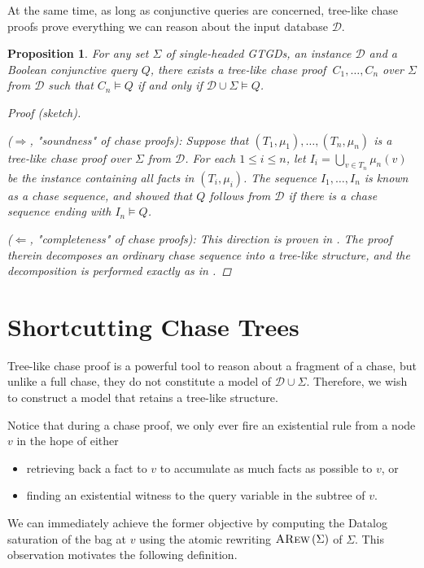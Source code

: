 \documentclass[12pt]{report}
\theoremstyle{plain}
\newtheorem{proposition}[theorem]{Proposition}
\theoremstyle{definition}
\newcommand{\ARew}[1]{\ensuremath{\normalfont{\textsc{ARew}} \left( #1 \right)}}
\begin{document}
At the same time, as long as conjunctive queries are concerned, tree-like chase proofs prove everything we can reason about the input database $\mathcal{D}$.

\begin{proposition}
\label{chase-proof-completeness}
  For any set $\Sigma$ of single-headed GTGDs, an instance $\mathcal{D}$ and a Boolean conjunctive query $Q$, there exists a tree-like chase proof $\ C_1, \ldots, C_n$ over $\Sigma$ from $\mathcal{D}$ such that $C_n \models Q$ if and only if $\mathcal{D} \cup \Sigma \models Q$.
  \begin{proof}[Proof (sketch)] $ $\par
    ($\Longrightarrow$, "soundness" of chase proofs): Suppose that $(T_1, \mu_1), \ldots, (T_n, \mu_n)$ is a tree-like chase proof over $\Sigma$ from $\mathcal{D}$. For each $1 \leq i \leq n$, let $I_i = \bigcup_{v \in T_n} \mu_n(v)$ be the instance containing all facts in $(T_i, \mu_i)$. The sequence $I_1, \ldots, I_n$ is known as a \emph{chase sequence}, and \cite{fagin_kolaitis_miller_popa_2005} showed that $Q$ follows from $\mathcal{D}$ if there is a chase sequence ending with $I_n \models Q$.

    ($\Longleftarrow$, "completeness" of chase proofs): This direction is proven in \cite[Proposition 2.6.9]{kappelmann_2019}. The proof therein decomposes an ordinary chase sequence into a tree-like structure, and the decomposition is performed exactly as in .
  \end{proof}
\end{proposition}

\section{Shortcutting Chase Trees}

Tree-like chase proof is a powerful tool to reason about a fragment of a chase, but unlike a full chase, they do not constitute a model of $\mathcal{D} \cup \Sigma$. Therefore, we wish to construct a model that retains a tree-like structure.

Notice that during a chase proof, we only ever fire an existential rule from a node $v$ in the hope of either
\begin{itemize}
  \item retrieving back a fact to $v$ to accumulate as much facts as possible to $v$, or
  \item finding an existential witness to the query variable in the subtree of $v$.
\end{itemize}
We can immediately achieve the former objective by computing the Datalog saturation of the bag at $v$ using the atomic rewriting $\ARew{\Sigma}$ of $\Sigma$. This observation motivates the following definition.
\end{document}
